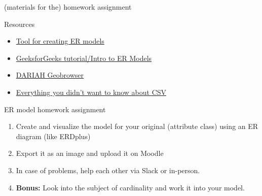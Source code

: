 \begin{frame}{(materials for the) homework assignment}
\begin{exampleblock}{Resources}
    \begin{itemize}\footnotesize
        \item \href{https://erdplus.com/standalone}{Tool for creating ER models}
        \item \href{https://www.geeksforgeeks.org/introduction-of-er-model/}{GeeksforGeeks tutorial/Intro to ER Models}
        \item \href{https://geobrowser.de.dariah.eu/}{DARIAH Geobrowser}
        \item \href{https://www.cloudbakers.com/blog/everything-you-didnt-want-to-have-to-know-about-csv}{Everything you didn't want to know about CSV}
    \end{itemize}
\end{exampleblock}

\begin{alertblock}{ER model homework assignment}
    \begin{enumerate}\footnotesize
        \item Create and visualize the model for your original (attribute class) using an ER diagram (like ERDplus) %
        \item Export it as an image and upload it on Moodle %
        \item In case of problems, help each other via Slack or in-person. %
        \item \textbf{Bonus:} Look into the subject of cardinality and work it into your model. %
    \end{enumerate}
\end{alertblock}
\end{frame}



